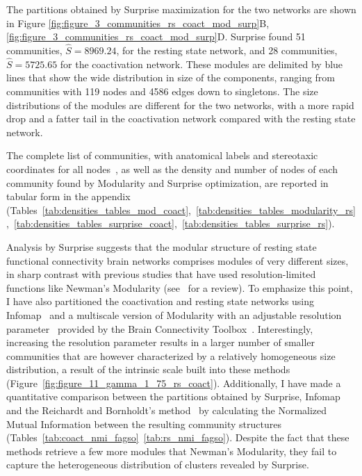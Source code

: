 The partitions obtained by Surprise maximization for the two networks are shown in Figure \ref{fig:figure_3_communities_rs_coact_mod_surp}B, \ref{fig:figure_3_communities_rs_coact_mod_surp}D. Surprise found 51 communities, $\hat{S}=8969.24$, for the resting state network, and 28 communities, $\hat{S}=5725.65$ for the coactivation network.
These modules are delimited by blue lines that show the wide distribution in size of the components, ranging from communities with 119 nodes and 4586 edges down to singletons.
The size distributions of the modules are different for the two networks, with a more rapid drop and a fatter tail in the coactivation network compared with the resting state network.

The complete list of communities, with anatomical labels and stereotaxic coordinates for all nodes~\cite{laird2010,lancaster2007,tzourio2002}, as well as the density and number of nodes of each community found by Modularity and Surprise optimization, are reported in tabular form in the appendix (Tables~\ref{tab:densities_tables_mod_coact},~\ref{tab:densities_tables_modularity_rs},~\ref{tab:densities_tables_surprise_coact},~\ref{tab:densities_tables_surprise_rs}).

Analysis by Surprise suggests that the modular structure of resting state functional connectivity brain networks comprises modules of very different sizes, in sharp contrast with previous studies that have used resolution-limited functions like Newman's Modularity (see~\cite{meunier2010} for a review).
To emphasize this point, I have also partitioned the coactivation and resting state networks using Infomap~\cite{rosvall2008} and a multiscale version of Modularity with an adjustable resolution parameter~\cite{reichardt2006} provided by the Brain Connectivity Toolbox~\cite{rubinov2010}.
Interestingly, increasing the resolution parameter results in a larger number of smaller communities that are however characterized by a relatively homogeneous size distribution, a result of the intrinsic scale built into these methods (Figure~\ref{fig:figure_11_gamma_1_75_rs_coact}).
Additionally, I have made a quantitative comparison between the partitions obtained by Surprise, Infomap and the Reichardt and Bornholdt's method~\cite{reichardt2006} by calculating the Normalized Mutual Information between the resulting community structures (Tables~\ref{tab:coact_nmi_fagso}~\ref{tab:rs_nmi_fagso}). Despite the fact that these methods retrieve a few more modules that Newman's Modularity, they fail to capture the heterogeneous distribution of clusters revealed by Surprise. 

